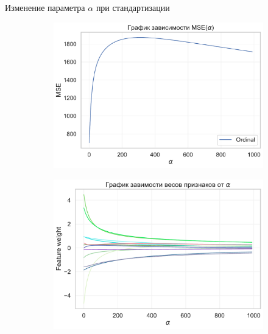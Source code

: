 \documentclass{beamer} %
\begin{document}
\begin{frame}{Изменение параметра $\alpha$ при стандартизации}
\begin{figure}
\begin{subfigure}[b]{0.475\textwidth}
                \includegraphics[width=\textwidth]{MSE_plot_scaled.pdf}
            \end{subfigure}
            \hfill
            \begin{subfigure}[b]{0.475\textwidth}   
                \centering 
                \includegraphics[width=\textwidth]{feature_plot_scaled.pdf}
            \end{subfigure} 
        \end{figure}
    \end{frame}
\end{document}
